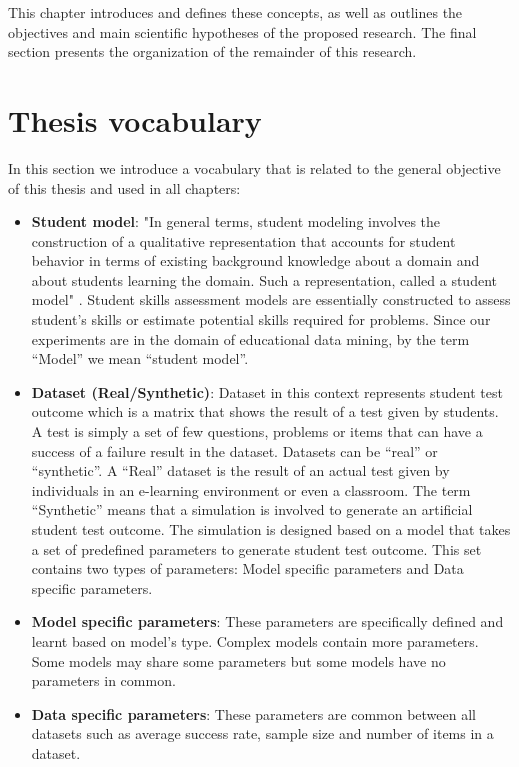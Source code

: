 This chapter introduces and defines these concepts, as well as outlines the objectives and main scientific hypotheses of the proposed research. The final section presents the organization of the remainder of this research.

\section{Thesis vocabulary}

In this section we introduce a vocabulary that is related to the general objective of this thesis and used in all chapters:

\begin{itemize}
\item \textbf{Student model}: "In general terms, student modeling involves the construction of a qualitative representation that accounts for student behavior in terms of existing background knowledge about a domain and about students learning the domain. Such a representation, called a student model" \citep{sison1998student}. Student skills assessment models are essentially constructed to assess student's skills or estimate potential skills required for problems. Since our experiments are in the domain of educational data mining, by the term ``Model'' we mean ``student model''. 
\item \textbf{Dataset (Real/Synthetic)}: Dataset in this context represents student test outcome which is a matrix that shows the result of a test given by students. A test is simply a set of few questions, problems or items that can have a success of a failure result in the dataset. Datasets can be ``real'' or ``synthetic''. A ``Real'' dataset is the result of an actual test given by individuals in an e-learning environment or even a classroom. The term ``Synthetic'' means that a simulation is involved to generate an artificial student test outcome. The simulation is designed based on a model that takes a set of predefined parameters to generate student test outcome. This set contains two types of parameters: Model specific parameters and Data specific parameters.
\item \textbf{Model specific parameters}: These parameters are specifically defined and learnt based on model's type. Complex models contain more parameters. Some models may share some parameters but some models have no parameters in common.
\item \textbf{Data specific parameters}: These parameters are common between all datasets such as average success rate, sample size and number of items in a dataset.

\end{itemize}
